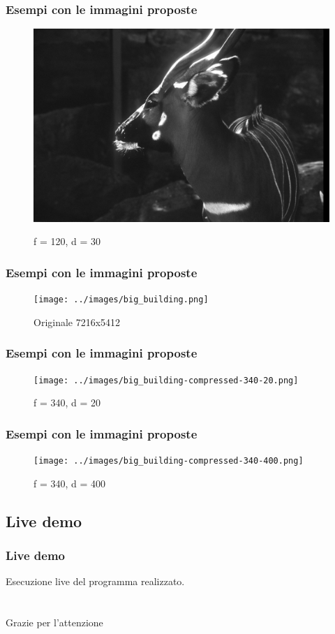 \documentclass{beamer}
\begin{document}
\begin{frame}
	\frametitle{Esempi con le immagini proposte}
	\begin{figure}
		{\includegraphics[width=.8\linewidth]{../images/deer-compressed-120-30.png}}
		\caption{f = 120, d = 30}
	\end{figure}
\end{frame}

\begin{frame}
	\frametitle{Esempi con le immagini proposte}
	\begin{figure}
		{\texttt{[image: ../images/big\_building.png]}}
		\caption{Originale 7216x5412}
	\end{figure}
\end{frame}

\begin{frame}
	\frametitle{Esempi con le immagini proposte}
	\begin{figure}
		{\texttt{[image: ../images/big\_building-compressed-340-20.png]}}
		\caption{f = 340, d = 20}
	\end{figure}
\end{frame}

\begin{frame}
	\frametitle{Esempi con le immagini proposte}
	\begin{figure}
		{\texttt{[image: ../images/big\_building-compressed-340-400.png]}}
		\caption{f = 340, d = 400}
	\end{figure}
\end{frame}

\subsection{Live demo}
\begin{frame}
\frametitle{Live demo}
Esecuzione live del programma realizzato.
\end{frame}

\section*{}
\begin{frame}
\Huge{\centerline{Grazie per l'attenzione}}
\end{frame}
\end{document}
